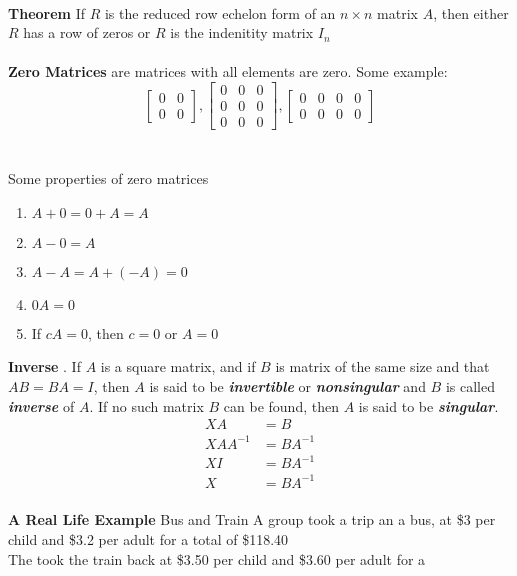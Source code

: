 \documentclass[a4paper, 12pt]{article}
\begin{document}
\\
\textbf{Theorem} If $R$ is the reduced row echelon form of an $n \times n$
matrix $A$, then either $R$ has a row of zeros or $R$ is the indenitity
matrix $I_n$
\\
\\
\textbf{Zero Matrices} are matrices with all elements are zero. Some example:
\[
\left[{
\begin{array}{cc}
0 & 0 \\
0 & 0
\end{array} 
} \right]
,
\left[{
\begin{array}{ccc}
0 & 0 & 0 \\
0 & 0 & 0 \\
0 & 0 & 0
\end{array}
}\right]
,
\left[{
\begin{array}{cccc}
0 & 0 & 0 & 0\\
0 & 0 & 0 & 0
\end{array}
}\right]
\]
\\
\\
Some properties of zero matrices
\\
\begin{enumerate}
\item $A + 0 = 0 + A = A$
\item $A - 0 = A$
\item $A - A = A + (-A) = 0$
\item $0A = 0$
\item If $cA = 0$, then $c = 0$ or $A = 0$
\end{enumerate}
\textbf{Inverse} . If $A$ is a square matrix, and if $B$ is matrix of 
the same size and that $AB = BA = I$, then $A$ is said to be 
\textit{\textbf{invertible}} or \textit{\textbf{nonsingular}} and $B$
is called \textit{\textbf{inverse}} of $A$. If no such matrix $B$
can be found, then $A$ is said to be \textit{\textbf{singular}}.
\\
\begin{align*}
XA &= B \\
XAA^{-1} &= BA^{-1} \\
XI &= BA^{-1} \\
X &= BA^{-1} 
\end{align*}
\\
\textbf{A Real Life Example} Bus and Train
A group took a trip an a bus, at  \$3 per child and \$3.2 per adult for 
a total of \$118.40\\
The took the train back at \$3.50 per child and \$3.60 per adult for a 
\end{document}
